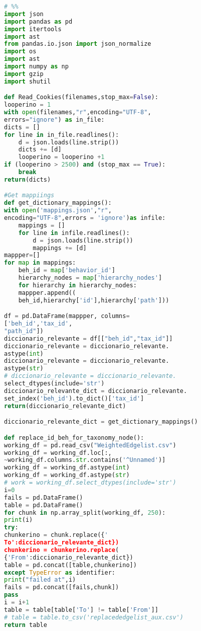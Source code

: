 \begin{lstlisting}[language=Python]
# %%
import json
import pandas as pd
import itertools
import ast
from pandas.io.json import json_normalize 
import os
import ast
import numpy as np
import gzip
import shutil

def Read_Cookies(filenames,stop_max=False):
looperino = 1
with open(filenames,"r",encoding="UTF-8", 
errors="ignore") as in_file:
dicts = []
for line in in_file.readlines(): 
    d = json.loads(line.strip())
    dicts += [d]
    looperino = looperino +1
if (looperino > 2500) and (stop_max == True):
    break
return(dicts)

#Get mappiings
def get_dictionary_mappings():
with open('mappings.json',"r",
encoding="UTF-8",errors = 'ignore')as infile:
    mappings = []
    for line in infile.readlines(): 
        d = json.loads(line.strip())
        mappings += [d]
mappper=[]
for map in mappings:
    beh_id = map['behavior_id']
    hierarchy_nodes = map['hierarchy_nodes']
    for hierarchy in hierarchy_nodes:
    mappper.append((
    beh_id,hierarchy['id'],hierarchy['path']))

df = pd.DataFrame(mappper, columns=
['beh_id','tax_id',
"path_id"])
diccionario_relevante = df[["beh_id","tax_id"]]
diccionario_relevante = diccionario_relevante.
astype(int)
diccionario_relevante = diccionario_relevante.
astype(str)
# diccionario_relevante = diccionario_relevante.
select_dtypes(include='str')
diccionario_relevante_dict = diccionario_relevante.
set_index('beh_id').to_dict()['tax_id']
return(diccionario_relevante_dict)

diccionario_relevante_dict = get_dictionary_mappings()

def replace_id_beh_for_taxonomy_node():
working_df = pd.read_csv("WeightedEdgelist.csv")
working_df = working_df.loc[:,
~working_df.columns.str.contains('^Unnamed')]
working_df = working_df.astype(int)
working_df = working_df.astype(str)
# work = working_df.select_dtypes(include='str')
i=0
fails = pd.DataFrame()
table = pd.DataFrame()
for chunk in np.array_split(working_df, 250):
print(i)
try:
chunkerino = chunk.replace({'
To':diccionario_relevante_dict})
chunkerino = chunkerino.replace(
{'From':diccionario_relevante_dict})
table = pd.concat([table,chunkerino])
except TypeError as identifier:
print("failed at",i)
fails = pd.concat([fails,chunk])
pass
i = i+1
table = table[table['To'] != table['From']]
# table = table.to_csv('replacededgelist_aux.csv')
return table


\end{lstlisting}
